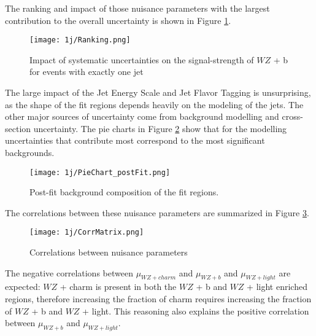The ranking and impact of those nuisance parameters with the largest contribution to the overall uncertainty is shown in Figure \ref{fig:ranking_1j}.

\begin{figure}[H]
    \centering
    \texttt{[image: 1j/Ranking.png]}
    \caption{Impact of systematic uncertainties on the signal-strength of $WZ$ + b for events with exactly one jet}
    \label{fig:ranking_1j}
\end{figure}

The large impact of the Jet Energy Scale and Jet Flavor Tagging is unsurprising, as the shape of the fit regions depends heavily on the modeling of the jets. The other major sources of uncertainty come from background modelling and cross-section uncertainty. The pie charts in Figure \ref{fig:pie_chart_1j} show that for the modelling uncertainties that contribute most correspond to the most significant backgrounds. %

\begin{figure}[H]
    \centering
    \texttt{[image: 1j/PieChart\_postFit.png]}
    \caption{Post-fit background composition of the fit regions.}
    \label{fig:pie_chart_1j}
\end{figure}

The correlations between these nuisance parameters are summarized in Figure \ref{fig:corr_mat_1j}. 

\begin{figure}[H]
    \centering
    \texttt{[image: 1j/CorrMatrix.png]}
    \caption{Correlations between nuisance parameters}
    \label{fig:corr_mat_1j}
\end{figure}

The negative correlations between $\mu_{WZ+charm}$ and $\mu_{WZ+b}$ and $\mu_{WZ+light}$ are expected: $WZ$ + charm is present in both the $WZ$ + b and $WZ$ + light enriched regions, therefore increasing the fraction of charm requires increasing the fraction of $WZ$ + b and $WZ$ + light. This reasoning also explains the positive correlation between $\mu_{WZ+b}$ and $\mu_{WZ+light}$. 

